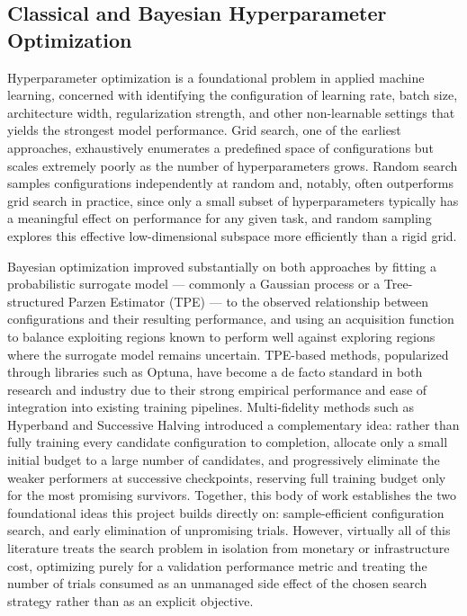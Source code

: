 \documentclass[11pt]{article}
\begin{document}
\subsection{Classical and Bayesian Hyperparameter Optimization}

Hyperparameter optimization is a foundational problem in applied machine learning, concerned with identifying the configuration of learning rate, batch size, architecture width, regularization strength, and other non-learnable settings that yields the strongest model performance. Grid search, one of the earliest approaches, exhaustively enumerates a predefined space of configurations but scales extremely poorly as the number of hyperparameters grows. Random search samples configurations independently at random and, notably, often outperforms grid search in practice, since only a small subset of hyperparameters typically has a meaningful effect on performance for any given task, and random sampling explores this effective low-dimensional subspace more efficiently than a rigid grid.

Bayesian optimization improved substantially on both approaches by fitting a probabilistic surrogate model --- commonly a Gaussian process or a Tree-structured Parzen Estimator (TPE) --- to the observed relationship between configurations and their resulting performance, and using an acquisition function to balance exploiting regions known to perform well against exploring regions where the surrogate model remains uncertain. TPE-based methods, popularized through libraries such as Optuna, have become a de facto standard in both research and industry due to their strong empirical performance and ease of integration into existing training pipelines. Multi-fidelity methods such as Hyperband and Successive Halving introduced a complementary idea: rather than fully training every candidate configuration to completion, allocate only a small initial budget to a large number of candidates, and progressively eliminate the weaker performers at successive checkpoints, reserving full training budget only for the most promising survivors. Together, this body of work establishes the two foundational ideas this project builds directly on: sample-efficient configuration search, and early elimination of unpromising trials. However, virtually all of this literature treats the search problem in isolation from monetary or infrastructure cost, optimizing purely for a validation performance metric and treating the number of trials consumed as an unmanaged side effect of the chosen search strategy rather than as an explicit objective.
\end{document}
